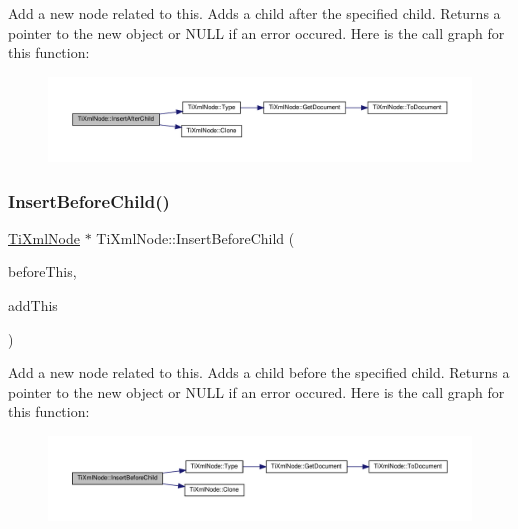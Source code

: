 Add a new node related to this. Adds a child after the specified child. Returns a pointer to the new object or N\+U\+LL if an error occured. Here is the call graph for this function\+:
\nopagebreak
\begin{figure}[H]
\begin{center}
\leavevmode
\includegraphics[width=350pt]{classTiXmlNode_a274db3292218202805c093f66a964cb5_cgraph}
\end{center}
\end{figure}
\mbox{\label{classTiXmlNode_a71e54e393336382bc9875f64aab5cb15}} 
\subsubsection{\texorpdfstring{Insert\+Before\+Child()}{InsertBeforeChild()}}
{\footnotesize\ttfamily \hyperlink{classTiXmlNode}{Ti\+Xml\+Node} $\ast$ Ti\+Xml\+Node\+::\+Insert\+Before\+Child (\begin{DoxyParamCaption}\item[{\hyperlink{classTiXmlNode}{Ti\+Xml\+Node} $\ast$}]{before\+This,  }\item[{const \hyperlink{classTiXmlNode}{Ti\+Xml\+Node} \&}]{add\+This }\end{DoxyParamCaption})}

Add a new node related to this. Adds a child before the specified child. Returns a pointer to the new object or N\+U\+LL if an error occured. Here is the call graph for this function\+:
\nopagebreak
\begin{figure}[H]
\begin{center}
\leavevmode
\includegraphics[width=350pt]{classTiXmlNode_a71e54e393336382bc9875f64aab5cb15_cgraph}
\end{center}
\end{figure}
\mbox{\label{classTiXmlNode_af287a913ce46d8dbf7ef24fec69bbaf0}} 

